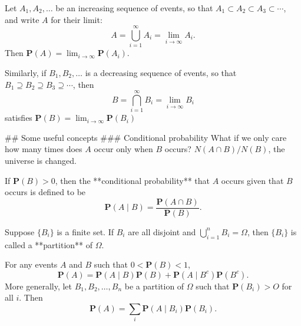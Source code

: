 \begin{lemma}
Let $A_1, A_2, \dots$ be an increasing sequence of events, so that $A_1 \subset A_2 \subset A_3 \subset \cdots$, and write $A$ for their limit:
\begin{equation*}
    A = \bigcup_{i=1}^\infty A_i = \lim_{i \to \infty} A_i.
\end{equation*}
Then $\mathbf{P}(A) = \lim_{i\to\infty} \mathbf{P}(A_i)$. 

Similarly, if $B_1, B_2, \dots$ is a decreasing sequence of events, so that $B_1 \supseteq  B_2 \supseteq B_3 \supseteq \cdots$, then 
\begin{equation*}
    B = \bigcap_{i=1}^\infty B_i = \lim_{i \to \infty} B_i
\end{equation*}
satisfies $\mathbf{P}(B) = \lim_{i\to\infty} \mathbf{P}(B_i)$
\end{lemma}


## Some useful concepts
### Conditional probability
What if we only care how many times does $A$ occur only when $B$ occurs? $N(A\cap B) / N(B)$, the universe is changed. 
\begin{definition}
If $\mathbf{P}(B) > 0$, then the **conditional probability** that $A$ occurs given that $B$ occurs is defined to be
\begin{equation*}
    \mathbf{P}(A \;\vert\; B) = \frac{\mathbf{P}(A \cap B)}{\mathbf{P}(B)}.
\end{equation*}
\end{definition}

\begin{definition}
Suppose $\{B_i\}$ is a finite set. If $B_i$ are all disjoint and $\bigcup_{i=1}^n B_i = \Omega$, then $\{B_i\}$ is called a **partition** of $\Omega$.
\end{definition}

\begin{lemma}
For any events $A$ and $B$ such that $0 < \mathbf{P}(B) < 1$,
\begin{equation*}
    \mathbf{P}(A) = \mathbf{P}(A \;\vert\; B) \mathbf{P}(B) + \mathbf{P}(A \;\vert\; B^c) \mathbf{P}(B^c).
\end{equation*}
More generally, let $B_1,  B_2, \dots, B_n$ be a partition of $\Omega$ such that $\mathbf{P}(B_i) > O$ for all $i$. Then 
\begin{equation*}
    \mathbf{P}(A) = \sum_i \mathbf{P}(A \;\vert\; B_i) \mathbf{P}(B_i).
\end{equation*}
\end{lemma}

